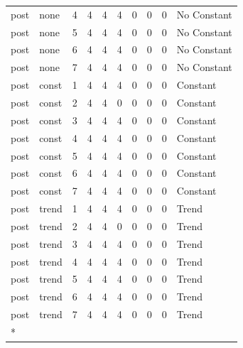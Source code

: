 \begin{longtable}[t]{llrrrrrrrl}
post & none & 4 & 4 & 4 & 4 & 0 & 0 & 0 & No Constant\\
post & none & 5 & 4 & 4 & 4 & 0 & 0 & 0 & No Constant\\
post & none & 6 & 4 & 4 & 4 & 0 & 0 & 0 & No Constant\\
post & none & 7 & 4 & 4 & 4 & 0 & 0 & 0 & No Constant\\
post & const & 1 & 4 & 4 & 4 & 0 & 0 & 0 & Constant\\
\addlinespace
post & const & 2 & 4 & 4 & 0 & 0 & 0 & 0 & Constant\\
post & const & 3 & 4 & 4 & 4 & 0 & 0 & 0 & Constant\\
post & const & 4 & 4 & 4 & 4 & 0 & 0 & 0 & Constant\\
post & const & 5 & 4 & 4 & 4 & 0 & 0 & 0 & Constant\\
post & const & 6 & 4 & 4 & 4 & 0 & 0 & 0 & Constant\\
\addlinespace
post & const & 7 & 4 & 4 & 4 & 0 & 0 & 0 & Constant\\
post & trend & 1 & 4 & 4 & 4 & 0 & 0 & 0 & Trend\\
post & trend & 2 & 4 & 4 & 0 & 0 & 0 & 0 & Trend\\
post & trend & 3 & 4 & 4 & 4 & 0 & 0 & 0 & Trend\\
post & trend & 4 & 4 & 4 & 4 & 0 & 0 & 0 & Trend\\
\addlinespace
post & trend & 5 & 4 & 4 & 4 & 0 & 0 & 0 & Trend\\
post & trend & 6 & 4 & 4 & 4 & 0 & 0 & 0 & Trend\\
post & trend & 7 & 4 & 4 & 4 & 0 & 0 & 0 & Trend\\*
\end{longtable}
\endgroup{}
